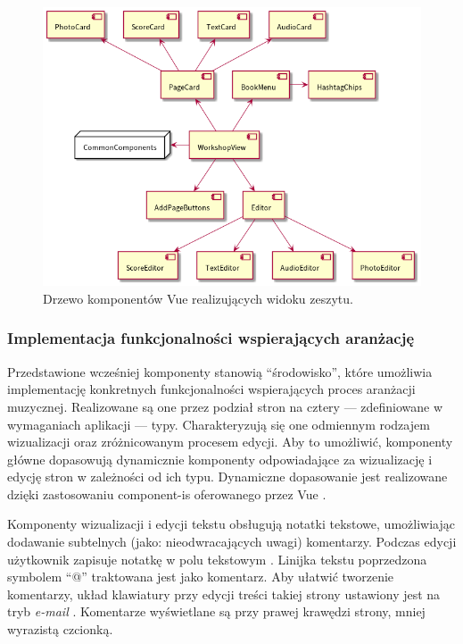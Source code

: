 \begin{figure}[H]
	\begin{center}
		\includegraphics[scale=0.6]{media/WorkshopComponents.png}
	\end{center}
	\caption{Drzewo komponentów Vue realizujących widoku zeszytu.}
	\label{rys:workshop-components}
\end{figure}

\subsubsection{Implementacja funkcjonalności wspierających aranżację}
Przedstawione wcześniej komponenty stanowią \enquote{środowisko}, które umożliwia implementację konkretnych funkcjonalności
wspierających proces aranżacji muzycznej. Realizowane są one przez podział stron na cztery — zdefiniowane w wymaganiach aplikacji — typy.
Charakteryzują się one odmiennym rodzajem wizualizacji oraz zróżnicowanym procesem edycji. Aby to umożliwić, komponenty główne
dopasowują dynamicznie komponenty odpowiadające za wizualizację i edycję stron w zależności od ich typu.
Dynamiczne dopasowanie jest realizowane dzięki zastosowaniu component-is oferowanego przez Vue \cite{vue}.

Komponenty wizualizacji i edycji tekstu obsługują notatki tekstowe, umożliwiając dodawanie subtelnych (jako: nieodwracających uwagi)
komentarzy. Podczas edycji użytkownik zapisuje notatkę w polu tekstowym \cite{ionic}. Linijka tekstu poprzedzona symbolem \enquote{@} traktowana jest
jako komentarz. Aby ułatwić tworzenie komentarzy, układ klawiatury przy edycji treści takiej strony ustawiony jest na tryb \textit{e-mail} \cite{ionic}.
Komentarze wyświetlane są przy prawej krawędzi strony, mniej wyrazistą czcionką.

